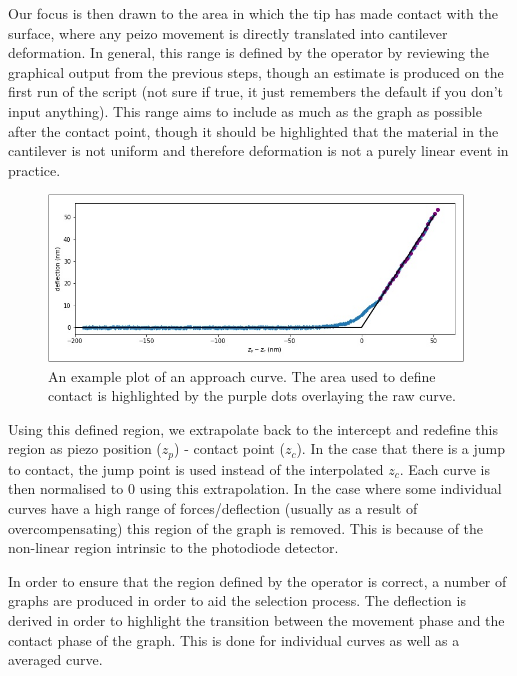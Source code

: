 Our focus is then drawn to the area in which the tip has made contact with the surface, where any peizo movement is directly translated into cantilever deformation. In general, this range is defined by the operator by reviewing the graphical output from the previous steps, though an estimate is produced on the first run of the script (not sure if true, it just remembers the default if you don't input anything). This range aims to include as much as the graph as possible after the contact point, though it should be highlighted that the material in the cantilever is not uniform and therefore deformation is not a purely linear event in practice.

\begin{figure}[h!]    
        \begin{center}
          \includegraphics[width=110mm]{chapter4/contactRegion.png}
\end{center}
\caption{An example plot of an approach curve. The area used to define contact is highlighted by the purple dots overlaying the raw curve.} %
\label{fig:contactRegion}                
\end{figure}

Using this defined region, we extrapolate back to the intercept and redefine this region as piezo position ($z_p$) - contact point ($z_c$). In the case that there is a jump to contact, the jump point is used instead of the interpolated $z_c$. Each curve is then normalised to 0 using this extrapolation. In the case where some individual curves have a high range of forces/deflection (usually as a result of overcompensating) this region of the graph is removed. This is because of the non-linear region intrinsic to the photodiode detector.

In order to ensure that the region defined by the operator is correct, a number of graphs are produced in order to aid the selection process. The deflection is derived in order to highlight the transition between the movement phase and the contact phase of the graph. This is done for individual curves as well as a averaged curve.


